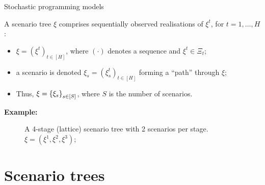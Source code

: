 \begin{frame}{Stochastic programming models}

	 A scenario tree $\xi$ comprises \alert{sequentially observed realisations} of $\xi^t$, for $t = 1, \dots, H$:
	 \vspace{-6pt}
	 \begin{itemize}
	 	\item $\xi = (\xi^t)_{t \in [H]}$, where $(\cdot)$ denotes a \alert{sequence} and $\xi^t \in \Xi_t$;  
	 	\item a \alert{scenario} is denoted $\xi_s = (\xi_s^t)_{t \in [H]}$ forming a ``path'' through $\xi$;
	 	\item Thus, $\xi = \left\{ \xi_s \right \}_{s \in [S]}$, where $S$ is the number of scenarios.
	 \end{itemize}
	 \pause
	 
 	{\bf Example:}
 
 	\vspace{-24pt} 
 	\begin{figure}
		\vspace{9pt}
		\caption{A 4-stage (\alert{lattice}) scenario tree with 2 scenarios per stage. $\xi = (\xi^1, \xi^2, \xi^3)$;}
	\end{figure}
	
	
\end{frame}


\section{Scenario trees}


